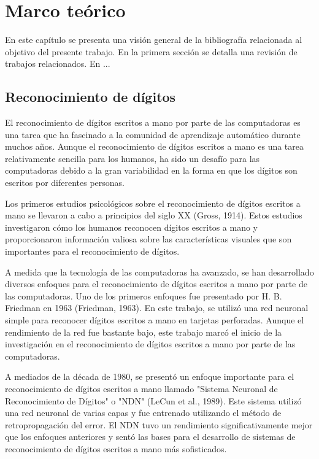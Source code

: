 \chapter{Marco te\'orico}
\label{Chapter2}

En este capítulo se presenta una visión general de la bibliografía relacionada al objetivo del presente trabajo. En la
primera sección se detalla una revisión de trabajos relacionados. En ... %

\section{Reconocimiento de d\'igitos}

El reconocimiento de dígitos escritos a mano por parte de las computadoras es una tarea que ha fascinado a la comunidad
de aprendizaje automático durante muchos años. Aunque el reconocimiento de dígitos escritos a mano es una tarea
relativamente sencilla para los humanos, ha sido un desafío para las computadoras debido a la gran variabilidad en la
forma en que los dígitos son escritos por diferentes personas.

Los primeros estudios psicológicos sobre el reconocimiento de dígitos escritos a mano se llevaron a cabo a principios
del siglo XX (Gross, 1914). Estos estudios investigaron cómo los humanos reconocen dígitos escritos a mano y
proporcionaron información valiosa sobre las características visuales que son importantes para el reconocimiento de
dígitos.

A medida que la tecnología de las computadoras ha avanzado, se han desarrollado diversos enfoques para el
reconocimiento de dígitos escritos a mano por parte de las computadoras. Uno de los primeros enfoques fue presentado
por H. B. Friedman en 1963 (Friedman, 1963). En este trabajo, se utilizó una red neuronal simple para reconocer dígitos
escritos a mano en tarjetas perforadas. Aunque el rendimiento de la red fue bastante bajo, este trabajo marcó el inicio
de la investigación en el reconocimiento de dígitos escritos a mano por parte de las computadoras.

A mediados de la década de 1980, se presentó un enfoque importante para el reconocimiento de dígitos escritos a mano
llamado "Sistema Neuronal de Reconocimiento de Dígitos" o "NDN" (LeCun et al., 1989). Este sistema utilizó una red
neuronal de varias capas y fue entrenado utilizando el método de retropropagación del error. El NDN tuvo un rendimiento
significativamente mejor que los enfoques anteriores y sentó las bases para el desarrollo de sistemas de reconocimiento
de dígitos escritos a mano más sofisticados.

